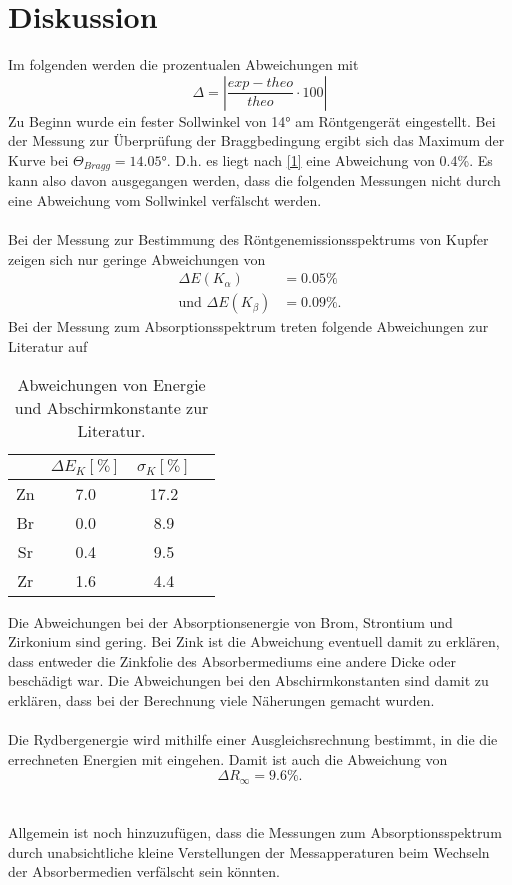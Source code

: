 \section{Diskussion}
\label{sec:Diskussion}
Im folgenden werden die prozentualen Abweichungen mit 
\begin{equation}\label{1}
    \Delta = |\frac{exp - theo}{theo} \cdot 100|
\end{equation}
Zu Beginn wurde ein fester Sollwinkel von 14° am Röntgengerät eingestellt. Bei der Messung zur Überprüfung der Braggbedingung 
ergibt sich das Maximum der Kurve bei $\Theta_{Bragg} = 14.05°$. D.h. es liegt nach \autoref{1} eine Abweichung von 0.4\%.
Es kann also davon ausgegangen werden, dass die folgenden Messungen nicht durch eine Abweichung vom Sollwinkel verfälscht werden.
\\
\\
Bei der Messung zur Bestimmung des Röntgenemissionsspektrums von Kupfer zeigen sich nur geringe Abweichungen von
\begin{align*}
    \Delta E(K_{\alpha}) &= 0.05\%\\
    \text{und } \Delta E(K_{\beta}) &= 0.09\%.
\end{align*}
Bei der Messung zum Absorptionsspektrum treten folgende Abweichungen zur Literatur \cite{energie_k} auf
\begin{table}\label{tab:2}
    \centering
    \begin{tabular}{c c c c}
        \toprule
        {} & {$\Delta E_{K}\left[\unit{\%}\right]$} & {$\sigma_{K}\left[\unit{\%}\right]$}\\
        \midrule
        Zn & 7.0 & 17.2\\
        Br & 0.0 & 8.9 \\
        Sr & 0.4 & 9.5 \\
        Zr & 1.6 & 4.4 \\       
        \bottomrule
    \end{tabular}
    \caption{Abweichungen von Energie und Abschirmkonstante zur Literatur.}
  \end{table}
Die Abweichungen bei der Absorptionsenergie von Brom, Strontium und Zirkonium sind gering. Bei Zink ist die Abweichung eventuell damit zu erklären, dass entweder die Zinkfolie
des Absorbermediums eine andere Dicke oder beschädigt war. 
Die Abweichungen bei den Abschirmkonstanten sind damit zu erklären, dass bei der Berechnung viele Näherungen gemacht wurden. 
\\
\\
Die Rydbergenergie wird mithilfe einer Ausgleichsrechnung bestimmt, in die die errechneten Energien mit eingehen. Damit ist auch die Abweichung von 
\begin{equation*}
    \Delta R_{\infty} = 9.6\%.
\end{equation*}
\\
\\
Allgemein ist noch hinzuzufügen, dass die Messungen zum Absorptionsspektrum durch unabsichtliche kleine Verstellungen der Messapperaturen beim Wechseln der
Absorbermedien verfälscht sein könnten. 